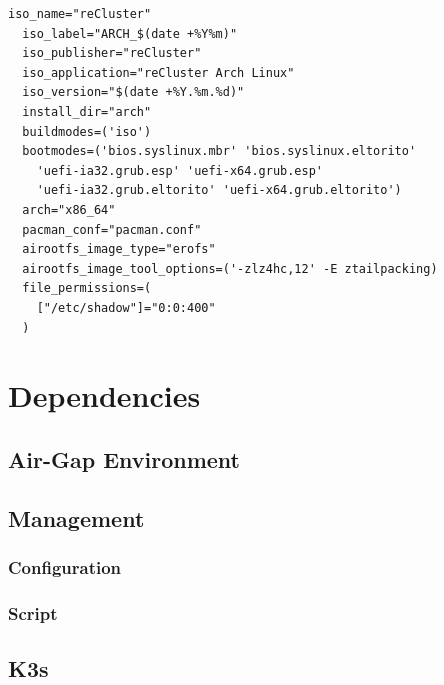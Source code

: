 \begin{lstlisting}[language=shell, morekeywords={[4]{iso_name, iso_label, iso_publisher, iso_application, iso_version, install_dir, buildmodes, bootmodes, arh, pacman_conf, airootfs_image, airootfs_image_tool_options, file_permissions}}, xleftmargin=\parindent, label={lst:arch}, caption=Contents of \texttt{profiledef.sh} file which shows the reCluster profile definition]
  iso_name="reCluster"
  iso_label="ARCH_$(date +%Y%m)"
  iso_publisher="reCluster"
  iso_application="reCluster Arch Linux"
  iso_version="$(date +%Y.%m.%d)"
  install_dir="arch"
  buildmodes=('iso')
  bootmodes=('bios.syslinux.mbr' 'bios.syslinux.eltorito'
    'uefi-ia32.grub.esp' 'uefi-x64.grub.esp'
    'uefi-ia32.grub.eltorito' 'uefi-x64.grub.eltorito')
  arch="x86_64"
  pacman_conf="pacman.conf"
  airootfs_image_type="erofs"
  airootfs_image_tool_options=('-zlz4hc,12' -E ztailpacking)
  file_permissions=(
    ["/etc/shadow"]="0:0:400"
  )
\end{lstlisting}

\section{Dependencies}
\label{sec:implementation_dependencies}


\subsection{Air-Gap Environment}
\label{subsec:implementation_dependencies_air_gap_environment}

\subsection{Management}
\label{subsec:implementation_dependencies_management}

\subsubsection{Configuration}
\label{subsec:implementation_dependencies_management_configuration}

\subsubsection{Script}
\label{subsec:implementation_dependencies_management_script}

\subsection{K3s}
\label{subsec:implementation_dependencies_k3s}

